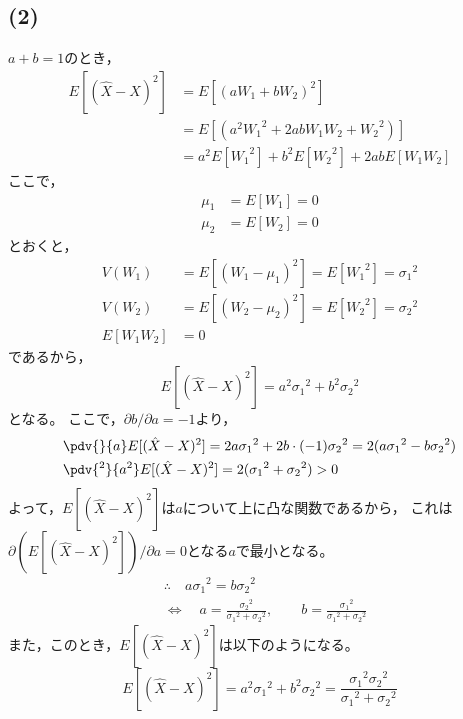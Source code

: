 \documentclass[class=jsarticle, crop=false, dvipdfmx, fleqn]{standalone}
\begin{document}
\subsection*{(2)}
$a + b = 1$のとき，
\begin{equation}
\begin{split}
E[(\hat{X} - X)^2] & = E[(aW_1 + bW_2)^2] \\
	& = E[(a^2 {W_1}^2 + 2ab W_1 W_2 + {W_2}^2)] \\
	& = a^2 E[{W_1}^2] + b^2 E[{W_2}^2] + 2ab E[W_1 W_2]
\end{split}
\end{equation}
ここで，
\begin{align}
\mu_1 & = E[W_1] = 0 \\
\mu_2 & = E[W_2] = 0
\end{align}
とおくと，
\begin{align}
V(W_1) & = E[(W_1 - \mu_1)^2] = E[{W_1}^2] = {\sigma_1}^2 \\
V(W_2) & = E[(W_2 - \mu_2)^2] = E[{W_2}^2] = {\sigma_2}^2 \\
E[W_1 W_2] & = 0
\end{align}
であるから，
\begin{equation}
E[(\hat{X} - X)^2] = a^2 {\sigma_1}^2 + b^2 {\sigma_2}^2
\end{equation}
となる。
ここで，$\partial b / \partial a = -1$より，
\begin{align}
& \pdv{}{a} E[(\hat{X} - X)^2] = 2a {\sigma_1}^2 + 2b \cdot (-1) {\sigma_2}^2 = 2(a{\sigma_1}^2 - b{\sigma_2}^2) \\
& \pdv{^2}{a^2} E[(\hat{X} - X)^2] = 2({\sigma_1}^2 + {\sigma_2}^2) > 0
\end{align}
よって，$E[(\hat{X} - X)^2]$は$a$について上に凸な関数であるから，
これは$\partial (E[(\hat{X} - X)^2])/\partial a = 0$となる$a$で最小となる。
\begin{align}
& \therefore \quad a{\sigma_1}^2 = b{\sigma_2}^2 \\
& \Leftrightarrow \quad 
	a = \frac{{\sigma_2}^2}{{\sigma_1}^2 + {\sigma_2}^2}, \qquad
	b = \frac{{\sigma_1}^2}{{\sigma_1}^2 + {\sigma_2}^2}
\end{align}
また，このとき，$E[(\hat{X} - X)^2]$は以下のようになる。
\begin{equation}
E[(\hat{X} - X)^2] = a^2 {\sigma_1}^2 + b^2 {\sigma_2}^2 = \frac{{\sigma_1}^2 {\sigma_2}^2}{{\sigma_1}^2 + {\sigma_2}^2}
\end{equation}
\end{document}
